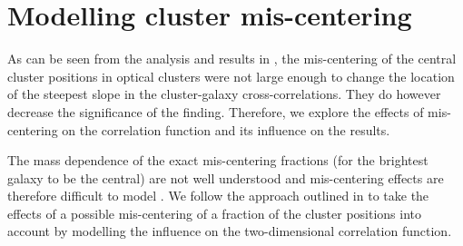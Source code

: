 \documentclass[iop, apjl, twocolappendix, numberedappendix]{emulateapj}
\begin{document}
\section{Modelling cluster mis-centering}
\label{sec:mis-centering}
As can be seen from the analysis and results in \citet{baxter2017halo},
the mis-centering of the central cluster positions in optical clusters
were not large enough to change the location of the steepest slope in
the cluster-galaxy cross-correlations. They do however decrease the
significance of the finding. Therefore, we explore the effects of
mis-centering on the correlation function and its influence on the
results.

The mass dependence of the exact mis-centering fractions (for the
brightest galaxy to be the central) are not well understood and
mis-centering effects are therefore difficult to model
\citep{Skibba:2011, Hoshino:2015}. We follow the approach outlined in
\citet{baxter2017halo} to take the effects of a possible mis-centering
of a fraction of the cluster positions into account by modelling the
influence on the two-dimensional correlation function.
\end{document}
